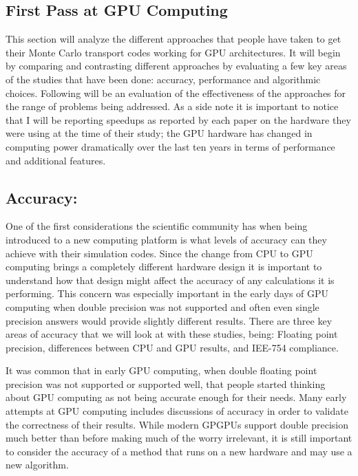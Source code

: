 \subsection{ \textbf{First Pass at GPU Computing}}

This section will analyze the different approaches that people have taken to get their Monte Carlo transport codes working for GPU architectures.
%
It will begin by comparing and contrasting different approaches by evaluating a few key areas of the studies that have been done: accuracy, performance and algorithmic choices.
%
Following will be an evaluation of the effectiveness of the approaches for the range of problems being addressed.
%
As a side note it is important to notice that I will be reporting speedups as reported by each paper on the hardware they were using at the time of their study; the GPU hardware has changed in computing power dramatically over the last ten years in terms of performance and additional features.

\subsection*{ \textbf{Accuracy:} }

One of the first considerations the scientific community has when being introduced to a new computing platform is what levels of accuracy can they achieve with their simulation codes.
%
Since the change from CPU to GPU computing brings a completely different hardware design it is important to understand how that design might affect the accuracy of any calculations it is performing.
%
This concern was especially important in the early days of GPU computing when double precision was not supported and often even single precision answers would provide slightly different results.
%
There are three key areas of accuracy that we will look at with these studies, being: Floating point precision, differences between CPU and GPU results, and IEE-754 compliance.
%

%
It was common that in early GPU computing, when double floating point precision was not supported or supported well, that people started thinking about GPU computing as not being accurate enough for their needs.
%
Many early attempts at GPU computing includes discussions of accuracy in order to validate the correctness of their results.
%
While modern GPGPUs support double precision much better than before making much of the worry irrelevant, it is still important to consider the accuracy of a method that runs on a new hardware and may use a new algorithm.
%


